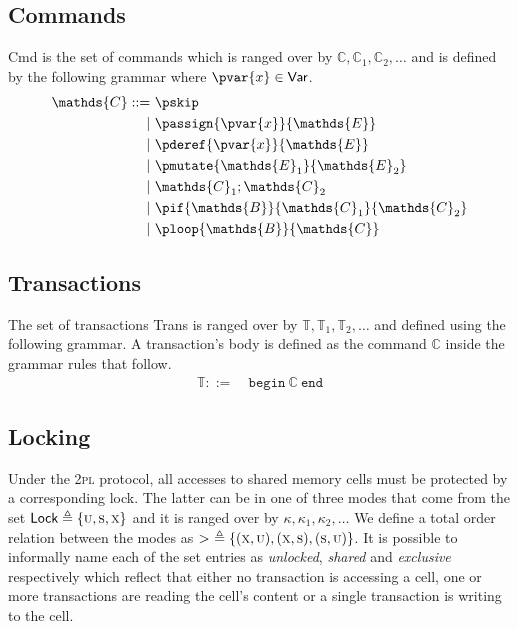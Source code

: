 \subsection{Commands}

\textsf{Cmd} is the set of commands which is ranged over by $\mathds{C}, \mathds{C}_1, \mathds{C}_2, \ldots$ and is defined by the following grammar where $\pvar{x} \in \mathsf{Var}$.
\begin{align*}
\mathds{C} ::=&
\ \pskip \\
|&\ \passign{\pvar{x}}{\mathds{E}} \\
|&\ \pderef{\pvar{x}}{\mathds{E}} \\
|&\ \pmutate{\mathds{E}_1}{\mathds{E}_2} \\
|&\ \mathds{C}_1; \mathds{C}_2 \\
|&\ \pif{\mathds{B}}{\mathds{C}_1}{\mathds{C}_2} \\
|&\ \ploop{\mathds{B}}{\mathds{C}}
\end{align*}

\subsection{Transactions}

The set of transactions \textsf{Trans} is ranged over by $\mathds{T}, \mathds{T}_1, \mathds{T}_2, \ldots$ and defined using the following grammar. A transaction's body is defined as the command $\mathds{C}$ inside the grammar rules that follow.
\begin{align*}
\mathds{T} ::=&
\ \mathtt{begin}\ \mathds{C}\ \mathtt{end}
\end{align*}

\subsection{Locking}

Under the \textsc{2pl} protocol, all accesses to shared memory cells must be protected by a corresponding lock. The latter can be in one of three modes that come from the set $\mathsf{Lock} \triangleq \{ \textsc{u}, \textsc{s}, \textsc{x} \}$ and it is ranged over by $\kappa, \kappa_1, \kappa_2, \ldots$ We define a total order relation between the modes as $>\ \triangleq \{ (\textsc{x}, \textsc{u}), (\textsc{x}, \textsc{s}), (\textsc{s}, \textsc{u}) \}$. It is possible to informally name each of the set entries as \textit{unlocked}, \textit{shared} and \textit{exclusive} respectively which reflect that either no transaction is accessing a cell, one or more transactions are reading the cell's content or a single transaction is writing to the cell.

